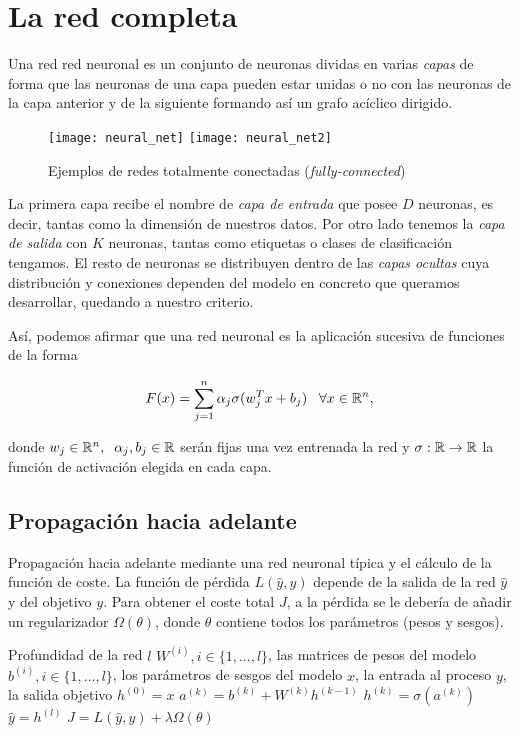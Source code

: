 \section{La red completa}

Una red red neuronal es un conjunto de neuronas dividas en varias \emph{capas} de forma que las neuronas de una capa pueden estar unidas o no con las neuronas de la capa anterior y de la siguiente formando así un grafo acíclico dirigido.\newline

\begin{figure}[htpb]
  \centering
  \texttt{[image: neural\_net]}
  \vrule
  \texttt{[image: neural\_net2]}
  \caption{Ejemplos de redes totalmente conectadas (\emph{fully-connected}) \stanford }
  \label{fig:fully-connected}
\end{figure}

La primera capa recibe el nombre de \emph{capa de entrada} que posee $D$ neuronas, es decir, tantas como la dimensión de nuestros datos. Por otro lado tenemos la \emph{capa de salida} con $K$ neuronas, tantas como etiquetas o clases de clasificación tengamos. El resto de neuronas se distribuyen dentro de las \emph{capas ocultas} cuya distribución y conexiones dependen del modelo en concreto que queramos desarrollar, quedando a nuestro criterio.\newline


Así, podemos afirmar que una red neuronal es la aplicación sucesiva de funciones de la forma

$$F(x)=\sum_{j=1}^n \alpha_j \sigma(w_j^Tx+b_j) \;\;\; \forall x \in \mathbb{R}^n,$$

donde $w_j\in\mathbb{R}^n,\;\; \alpha_j,b_j\in\mathbb{R}$ serán fijas una vez entrenada la red y $\sigma : \mathbb{R} \to \mathbb{R}$ la función de activación elegida en cada capa.\\

\subsection{Propagación hacia adelante}
\begin{algorithm}\label{alg:forward}
\caption{Propagación hacia adelante mediante una red neuronal típica y el cálculo de la función de coste. La función de pérdida $L(\hat{y},y)$ depende de la salida de la red $\hat{y}$ y del objetivo $y$. Para obtener el coste total $J$, a la pérdida se le debería de añadir un regularizador $\Omega(\theta)$, donde $\theta$ contiene todos los parámetros (pesos y sesgos).}
\begin{algorithmic}
\REQUIRE Profundidad de la red $l$
\REQUIRE $W^{(i)}, i\in\{1,...,l\}$, las matrices de pesos del modelo
\REQUIRE $b^{(i)}, i\in\{1,...,l\}$, los parámetros de sesgos del modelo
\REQUIRE $x$, la entrada al proceso
\REQUIRE $y$, la salida objetivo
\STATE $h^{(0)}=x$
\STATE $a^{(k)}=b^{(k)}+W^{(k)}h^{(k-1)}$
\STATE $h^{(k)}=\sigma(a^{(k)})$
\ENDFOR
\STATE $\hat{y}=h^{(l)}$
\STATE $J=L(\hat{y},y)+\lambda\Omega (\theta)$
\end{algorithmic}
\end{algorithm}

